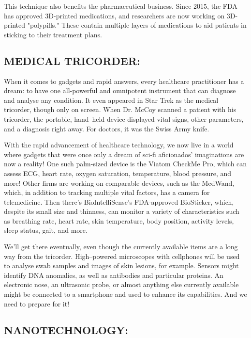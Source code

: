 \documentclass[12pt]{article}
\begin{document}
This technique also benefits the pharmaceutical business. Since 2015, the FDA has approved 3D-printed medications, and researchers are now working on 3D-printed "polypills." These contain multiple layers of medications to aid patients in sticking to their treatment plans.



\subsection{MEDICAL TRICORDER:}

When it comes to gadgets and rapid answers, every healthcare practitioner has a dream: to have one all-powerful and omnipotent instrument that can diagnose and analyse any condition. It even appeared in Star Trek as the medical tricorder, though only on screen. When Dr. McCoy scanned a patient with his tricorder, the portable, hand–held device displayed vital signs, other parameters, and a diagnosis right away. For doctors, it was the Swiss Army knife.


With the rapid advancement of healthcare technology, we now live in a world where gadgets that were once only a dream of sci-fi aficionados' imaginations are now a reality! One such palm-sized device is the Viatom CheckMe Pro, which can assess ECG, heart rate, oxygen saturation, temperature, blood pressure, and more! Other firms are working on comparable devices, such as the MedWand, which, in addition to tracking multiple vital factors, has a camera for telemedicine. Then there's BioIntelliSense's FDA-approved BioSticker, which, despite its small size and thinness, can monitor a variety of characteristics such as breathing rate, heart rate, skin temperature, body position, activity levels, sleep status, gait, and more.


We'll get there eventually, even though the currently available items are a long way from the tricorder. High–powered microscopes with cellphones will be used to analyse swab samples and images of skin lesions, for example. Sensors might identify DNA anomalies, as well as antibodies and particular proteins. An electronic nose, an ultrasonic probe, or almost anything else currently available might be connected to a smartphone and used to enhance its capabilities. And we need to prepare for it!



\subsection{NANOTECHNOLOGY:}
\end{document}
